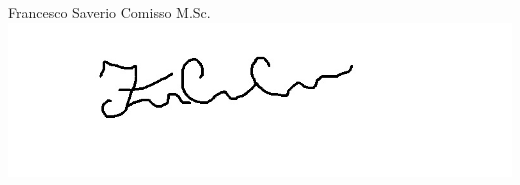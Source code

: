 \documentclass[10pt,a4paper,ragged2e,withhyper]{altacv}
\begin{document}
\begin{paracol}{2}
Francesco Saverio Comisso M.Sc.
\includegraphics[height=4\baselineskip]{Firma.jpg}






\end{paracol}
\end{document}
